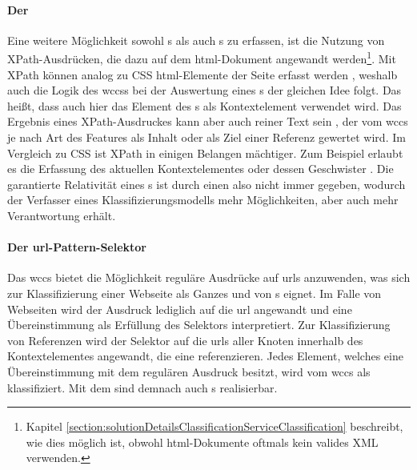         \paragraph{Der \xpathSelector}
        Eine weitere Möglichkeit sowohl {\contentFeature}s als auch {}s
        zu erfassen, ist die Nutzung von XPath-Ausdrücken,
        die dazu auf dem \gls{html}-Dokument angewandt
        werden\footnote{Kapitel \ref{section:solutionDetailsClassificationServiceClassification}
        beschreibt, wie dies möglich ist, obwohl \gls{html}-Dokumente oftmals kein
        valides XML verwenden.}.
        Mit XPath können analog zu CSS \gls{html}-Elemente der Seite erfasst werden
        \cite{w3c:xpath},
        weshalb auch die Logik des \glspl{wccs} bei der Auswertung eines {\xpathSelector}s der gleichen Idee folgt.
        Das heißt, dass auch hier das Element des {\parentFeature}s
        als Kontextelement verwendet wird.
        Das Ergebnis eines XPath-Ausdruckes kann aber auch reiner Text sein
        \cite{w3c:xpath},
        der vom \gls{wccs} je nach Art des Features als Inhalt oder als Ziel einer
        Referenz gewertet wird.
        Im Vergleich zu CSS ist XPath in einigen Belangen mächtiger.
        Zum Beispiel erlaubt es die Erfassung des aktuellen Kontextelementes
        oder dessen Geschwister \cite{w3c:xpath}.
        Die garantierte Relativität eines {\cssSelector}s ist durch
        einen {\xpathSelector} also nicht immer gegeben,
        wodurch der Verfasser eines Klassifizierungsmodells mehr Möglichkeiten,
        aber auch mehr Verantwortung erhält.

        \paragraph{Der \gls{url}-Pattern-Selektor}
        Das \gls{wccs} bietet die Möglichkeit reguläre Ausdrücke auf \glspl{url} anzuwenden,
        was sich zur Klassifizierung einer Webseite als Ganzes und von {}s eignet.
        Im Falle von Webseiten wird der Ausdruck lediglich auf die \gls{url} angewandt
        und eine Übereinstimmung als Erfüllung des Selektors interpretiert.       
        Zur Klassifizierung von Referenzen wird der Selektor auf die \glspl{url} aller Knoten
        innerhalb des Kontextelementes angewandt, die eine {\resource} referenzieren.
        Jedes Element, welches eine Übereinstimmung mit dem regulären Ausdruck besitzt,
        wird vom \gls{wccs} als {} klassifiziert.
        Mit dem {\urlSelector} sind demnach auch {\collectionFeature}s realisierbar.


